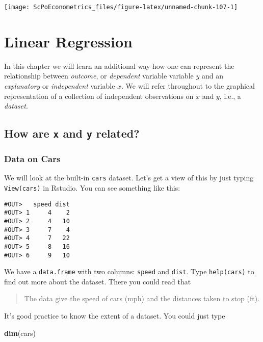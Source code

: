 \documentclass[]{book}
\newenvironment{Shaded}{\begin{snugshade}}{\end{snugshade}}
\newcommand{\KeywordTok}[1]{\textcolor[rgb]{0.13,0.29,0.53}{\textbf{#1}}}
\newcommand{\NormalTok}[1]{#1}
\begin{document}
\begin{center}\texttt{[image: ScPoEconometrics\_files/figure-latex/unnamed-chunk-107-1]} \end{center}

\chapter{Linear Regression}\label{linreg}

In this chapter we will learn an additional way how one can represent
the relationship between \emph{outcome}, or \emph{dependent} variable
variable \(y\) and an \emph{explanatory} or \emph{independent} variable
\(x\). We will refer throughout to the graphical representation of a
collection of independent observations on \(x\) and \(y\), i.e., a
\emph{dataset}.

\section{\texorpdfstring{How are \texttt{x} and \texttt{y}
related?}{How are x and y related?}}\label{how-are-x-and-y-related}

\subsection{Data on Cars}\label{data-on-cars}

We will look at the built-in \texttt{cars} dataset. Let's get a view of
this by just typing \texttt{View(cars)} in Rstudio. You can see
something like this:

\begin{verbatim}
#OUT>   speed dist
#OUT> 1     4    2
#OUT> 2     4   10
#OUT> 3     7    4
#OUT> 4     7   22
#OUT> 5     8   16
#OUT> 6     9   10
\end{verbatim}

We have a \texttt{data.frame} with two columns: \texttt{speed} and
\texttt{dist}. Type \texttt{help(cars)} to find out more about the
dataset. There you could read that

\begin{quote}
The data give the speed of cars (mph) and the distances taken to stop
(ft).
\end{quote}

It's good practice to know the extent of a dataset. You could just type

\begin{Shaded}
\begin{Highlighting}[]
\KeywordTok{dim}\NormalTok{(cars)}
\end{Highlighting}
\end{Shaded}
\end{document}
